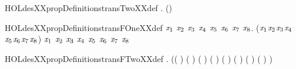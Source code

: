 \newcommand{\HOLdesXXpropDefinitionstransOneXXdef}{\UseVerbatim{HOLdesXXpropDefinitionstransOneXXdef}}
\begin{SaveVerbatim}{HOLdesXXpropDefinitionstransTwoXXdef}
\HOLTokenTurnstile{} \HOLSymConst{\HOLTokenForall{}}.   \HOLSymConst{=} (\HOLSymConst{,})
\end{SaveVerbatim}
\newcommand{\HOLdesXXpropDefinitionstransTwoXXdef}{\UseVerbatim{HOLdesXXpropDefinitionstransTwoXXdef}}
\begin{SaveVerbatim}{HOLdesXXpropDefinitionstransFOneXXdef}
\HOLTokenTurnstile{} \HOLSymConst{\HOLTokenForall{}}\ensuremath{\HOLBoundVar{x}\sb{\mathrm{1}}} \ensuremath{\HOLBoundVar{x}\sb{\mathrm{2}}} \ensuremath{\HOLBoundVar{x}\sb{\mathrm{3}}} \ensuremath{\HOLBoundVar{x}\sb{\mathrm{4}}} \ensuremath{\HOLBoundVar{x}\sb{\mathrm{5}}} \ensuremath{\HOLBoundVar{x}\sb{\mathrm{6}}} \ensuremath{\HOLBoundVar{x}\sb{\mathrm{7}}} \ensuremath{\HOLBoundVar{x}\sb{\mathrm{8}}}.
      (\ensuremath{\HOLBoundVar{x}\sb{\mathrm{1}}}\HOLSymConst{,}\ensuremath{\HOLBoundVar{x}\sb{\mathrm{2}}}\HOLSymConst{,}\ensuremath{\HOLBoundVar{x}\sb{\mathrm{3}}}\HOLSymConst{,}\ensuremath{\HOLBoundVar{x}\sb{\mathrm{4}}}\HOLSymConst{,}\ensuremath{\HOLBoundVar{x}\sb{\mathrm{5}}}\HOLSymConst{,}\ensuremath{\HOLBoundVar{x}\sb{\mathrm{6}}}\HOLSymConst{,}\ensuremath{\HOLBoundVar{x}\sb{\mathrm{7}}}\HOLSymConst{,}\ensuremath{\HOLBoundVar{x}\sb{\mathrm{8}}}) \HOLSymConst{=}
     \ensuremath{\HOLBoundVar{x}\sb{\mathrm{1}}}  \ensuremath{\HOLBoundVar{x}\sb{\mathrm{2}}}  \ensuremath{\HOLBoundVar{x}\sb{\mathrm{3}}}  \ensuremath{\HOLBoundVar{x}\sb{\mathrm{4}}}  \ensuremath{\HOLBoundVar{x}\sb{\mathrm{5}}}  \ensuremath{\HOLBoundVar{x}\sb{\mathrm{6}}}  \ensuremath{\HOLBoundVar{x}\sb{\mathrm{7}}}  \ensuremath{\HOLBoundVar{x}\sb{\mathrm{8}}}
\end{SaveVerbatim}
\newcommand{\HOLdesXXpropDefinitionstransFOneXXdef}{\UseVerbatim{HOLdesXXpropDefinitionstransFOneXXdef}}
\begin{SaveVerbatim}{HOLdesXXpropDefinitionstransFTwoXXdef}
\HOLTokenTurnstile{} \HOLSymConst{\HOLTokenForall{}}.   \HOLSymConst{=}
       (( \HOLSymConst{\HOLTokenExtract{}} ) \HOLSymConst{,}( \HOLSymConst{\HOLTokenExtract{}} ) \HOLSymConst{,}( \HOLSymConst{\HOLTokenExtract{}} ) \HOLSymConst{,}( \HOLSymConst{\HOLTokenExtract{}} ) \HOLSymConst{,}
        ( \HOLSymConst{\HOLTokenExtract{}} ) \HOLSymConst{,}( \HOLSymConst{\HOLTokenExtract{}} ) \HOLSymConst{,}( \HOLSymConst{\HOLTokenExtract{}} ) \HOLSymConst{,}( \HOLSymConst{\HOLTokenExtract{}} ) )
\end{SaveVerbatim}

